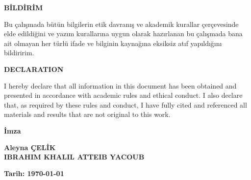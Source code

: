 \begin{center}
\textbf{BİLDİRİM}
\end{center}
\begin{singlespace}%
Bu çalışmada bütün bilgilerin etik davranış ve akademik kurallar çerçevesinde elde edildiğini ve yazım kurallarına uygun olarak hazırlanan bu çalışmada bana ait olmayan her türlü ifade ve bilginin kaynağına eksiksiz atıf yapıldığını bildiririm.
\end{singlespace}
\vspace{2cm}

\begin{center}
\textbf{DECLARATION}
\end{center}
\begin{singlespace}
I hereby declare that all information in this document has been obtained and presented in accordance with academic rules and ethical conduct. I also declare that, as required by these rules and conduct, I have fully cited and referenced all materials and results that are not original to this work.
\end{singlespace}

\vspace{3cm}
\begin{flushright}
\begin{minipage}{5cm}
\begin{center}
\textbf{İmza}

\textbf{Aleyna ÇELİK \\ IBRAHIM KHALIL ATTEIB YACOUB}

\textbf{Tarih: {\today}}\hfill
\end{center}
\end{minipage}
\end{flushright}
